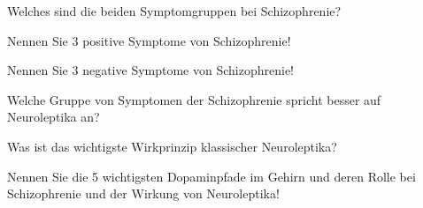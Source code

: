 \documentclass[10pt, a4paper]{exam}
\begin{document}
\begin{questions}
\begin{solution}
  \end{solution}

  \question Welches sind die beiden Symptomgruppen bei Schizophrenie?
  \begin{solution}

  \end{solution}

  \question Nennen Sie 3 positive Symptome von Schizophrenie!
  \begin{solution}

  \end{solution}

  \question Nennen Sie 3 negative Symptome von Schizophrenie!
  \begin{solution}

  \end{solution}

  \question Welche Gruppe von Symptomen der Schizophrenie spricht besser auf Neuroleptika an?
  \begin{solution}

  \end{solution}

  \question Was ist das wichtigste Wirkprinzip klassischer Neuroleptika?
  \begin{solution}

  \end{solution}

  \question Nennen Sie die 5 wichtigsten Dopaminpfade im Gehirn und deren Rolle bei Schizophrenie und der Wirkung von Neuroleptika!
  \begin{solution}

  \end{solution}
\end{questions}
\end{document}
